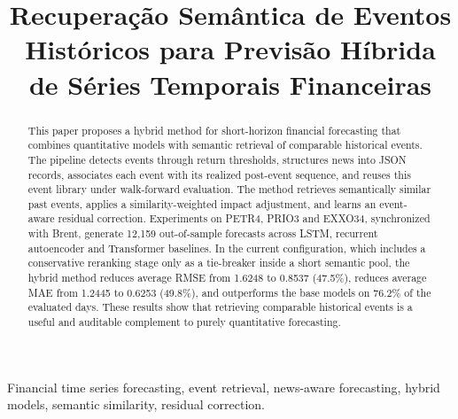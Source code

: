 \documentclass[conference]{IEEEtran}
\begin{document}
\title{Recuperação Semântica de Eventos Históricos para Previsão Híbrida de Séries Temporais Financeiras}

\author{
 \and
 \IEEEauthorblockA{}
 \and
 \IEEEauthorblockA{}
 \and
 \and
 \and
}

\maketitle

\begin{abstract}
This paper proposes a hybrid method for short-horizon financial forecasting that combines quantitative models with semantic retrieval of comparable historical events. The pipeline detects events through return thresholds, structures news into JSON records, associates each event with its realized post-event sequence, and reuses this event library under walk-forward evaluation. The method retrieves semantically similar past events, applies a similarity-weighted impact adjustment, and learns an event-aware residual correction. Experiments on PETR4, PRIO3 and EXXO34, synchronized with Brent, generate 12,159 out-of-sample forecasts across LSTM, recurrent autoencoder and Transformer baselines. In the current configuration, which includes a conservative reranking stage only as a tie-breaker inside a short semantic pool, the hybrid method reduces average RMSE from 1.6248 to 0.8537 (47.5\%), reduces average MAE from 1.2445 to 0.6253 (49.8\%), and outperforms the base models on 76.2\% of the evaluated days. These results show that retrieving comparable historical events is a useful and auditable complement to purely quantitative forecasting.
\end{abstract}

\begin{IEEEkeywords}
Financial time series forecasting, event retrieval, news-aware forecasting, hybrid models, semantic similarity, residual correction.
\end{IEEEkeywords}
\end{document}
